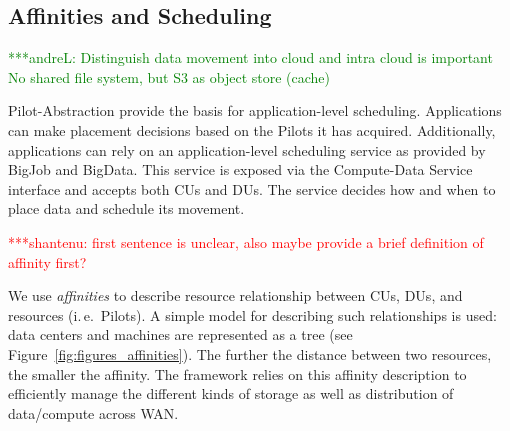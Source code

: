 \documentclass[times]{cpeauth}
\newcommand{\jhanote}[1]{ {\textcolor{red} { ***shantenu: #1 }}}
\newcommand{\alnote}[1]{ {\textcolor{green} { ***andreL: #1 }}}
\newcommand{\alnote}[1]{}
\newcommand{\jhanote}[1]{}
\newcommand{\pilot}{Pilot\xspace}
\newcommand{\pilots}{Pilots\xspace}
\newcommand{\computedataservice}{Compute-Data Service\xspace}
\newcommand{\computeunit}{Compute-Unit\xspace}
\newcommand{\dataunit}{Data-Unit\xspace}
\newcommand{\dus}{DUs\xspace}
\newcommand{\cus}{CUs\xspace}
\begin{document}





\subsection{Affinities and Scheduling}
\alnote{
Distinguish data movement into cloud and intra cloud is important
No shared file system, but S3 as object store (cache)
}



\pilot-Abstraction provide the basis for application-level scheduling.
Applications can make placement decisions based on the \pilots it has
acquired. Additionally, applications can rely on an application-level
scheduling service as provided by BigJob and BigData. This service is exposed
via the \computedataservice interface and accepts both \cus and \dus. The
service decides how and when to place data and schedule its movement. 

\jhanote{first sentence is unclear, also maybe provide a brief
  definition of affinity first?} 

We use {\it affinities} to describe resource relationship between \cus, \dus,
and resources (i.\,e.\ \pilots). A simple model for describing such
relationships is used: data centers and machines are represented as a tree
(see Figure~\ref{fig:figures_affinities}). The further the distance between
two resources, the smaller the affinity. The framework relies on this affinity
description to efficiently manage the different kinds of storage as well as
distribution of data/compute across WAN.
\end{document}
